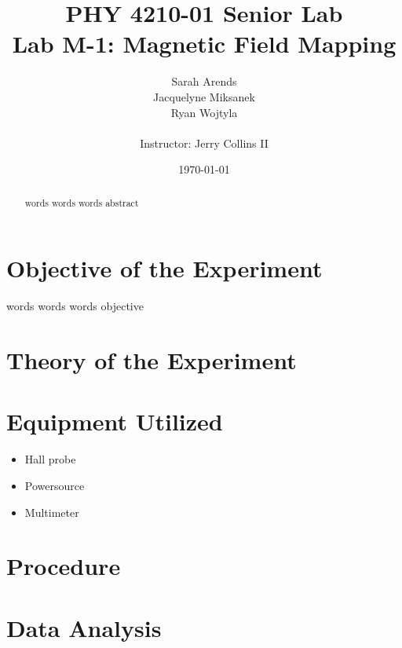 \documentclass[a4paper]{article}
\title{PHY 4210-01 Senior Lab \\Lab M-1: Magnetic Field Mapping}
\author{Sarah Arends \\ 
        Jacquelyne Miksanek \\
        Ryan Wojtyla \\ \\
        Instructor: Jerry Collins II}
\date{\today}
\begin{document}
\maketitle 

\begin{abstract}
\qq words words words abstract
\end{abstract}

\newpage

\tableofcontents

\newpage

\section{Objective of the Experiment}
\qq words words words objective

\section{Theory of the Experiment}

\section{Equipment Utilized}
\begin{itemize}
\item Hall probe
\item Powersource 
\item Multimeter
\end{itemize}

\section{Procedure}


\section{Data Analysis}
\end{document}
